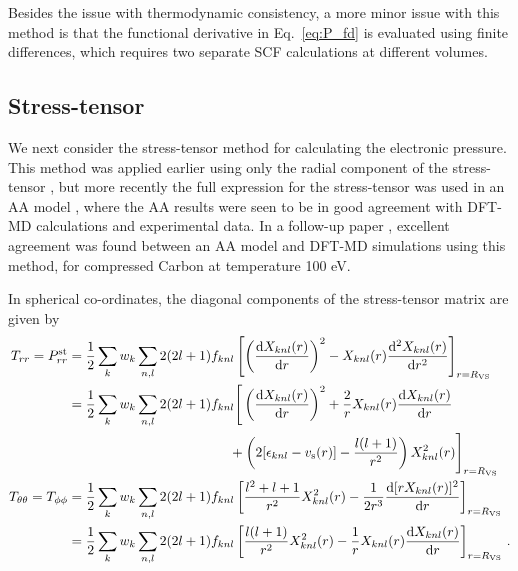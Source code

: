 \documentclass[%
 preprint,
 superscriptaddress,
 amsmath,amssymb,
longbibliography,
]{revtex4-2}
\newcommand{\vs}{v_\textrm{s}}
\newcommand{\RWS}{R_\textrm{VS}}
\newcommand{\Pstrr}{P^\textrm{st}_{rr}}
\begin{document}
Besides the issue with thermodynamic consistency, a more minor issue with this method is that the functional derivative in Eq.~\eqref{eq:P_fd} is evaluated using finite differences, which requires two separate SCF calculations at different volumes.

\subsection{Stress-tensor}\label{sec:P_st}

We next consider the stress-tensor method for calculating the electronic pressure. This method was applied earlier using only the radial component of the stress-tensor \cite{stress_tensor_more,stress_tensor_semi_rel,stress_tensor_rel}, but more recently the full expression for the stress-tensor was used in an AA model \cite{Pressure_warm_hot}, where the AA results were seen to be in good agreement with DFT-MD calculations and experimental data. In a follow-up paper \cite{Carbon_ionization}, excellent agreement was found between an AA model and DFT-MD simulations using this method, for compressed Carbon at temperature 100 eV.

In spherical co-ordinates, the diagonal components of the stress-tensor matrix are given by
\begin{align}
    T_{rr} = \Pstrr &= \frac{1}{2} \sum_k w_k \sum_{n,l} 2 (2l+1) f_{knl} \left[ \left(\dv{\rnl}{r} \right)^2  - \rnl \dv[2]{\rnl}{r}\right]_{r=\RWS} \\
    \nonumber
    &= \frac{1}{2} \sum_k w_k \sum_{n,l} 2 (2l+1) f_{knl} \Bigg[ \left(\dv{\rnl}{r} \right)^2  + \frac{2}{r}\rnl\dv{\rnl}{r} \\
    \label{eq:P_st_rr}
    & \hspace{12em}+ \left( 2[\epsilon_{knl} - \vs(r)] - \frac{l(l+1)}{r^2} \right) X_{knl}^2(r) \Bigg]_{r=\RWS}\\
    T_{\theta\theta} = T_{\phi\phi} &= \frac{1}{2} \sum_k w_k \sum_{n,l} 2 (2l+1) f_{knl} \left[ \frac{l^2+l+1}{r^2} X_{knl}^2(r) -\frac{1}{2r^3}\dv{[r\rnl]^2}{r} \right]_{r=\RWS} \\
    &=\frac{1}{2} \sum_k w_k \sum_{n,l} 2 (2l+1) f_{knl} \left[ \frac{l(l+1)}{r^2} X_{knl}^2(r) -\frac{1}{r}\rnl\dv{\rnl}{r} \right]_{r=\RWS}\,.
\end{align}
\end{document}
